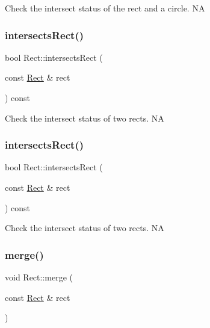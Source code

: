 Check the intersect status of the rect and a circle.  NA \mbox{\label{classRect_a1cda3d61f31818b138c051135c5a3bdd}} 
\subsubsection{\texorpdfstring{intersects\+Rect()}{intersectsRect()}\hspace{0.1cm}{\footnotesize\ttfamily [1/2]}}
{\footnotesize\ttfamily bool Rect\+::intersects\+Rect (\begin{DoxyParamCaption}\item[{const \hyperlink{classRect}{Rect} \&}]{rect }\end{DoxyParamCaption}) const}

Check the intersect status of two rects.  NA \mbox{\label{classRect_a1cda3d61f31818b138c051135c5a3bdd}} 
\subsubsection{\texorpdfstring{intersects\+Rect()}{intersectsRect()}\hspace{0.1cm}{\footnotesize\ttfamily [2/2]}}
{\footnotesize\ttfamily bool Rect\+::intersects\+Rect (\begin{DoxyParamCaption}\item[{const \hyperlink{classRect}{Rect} \&}]{rect }\end{DoxyParamCaption}) const}

Check the intersect status of two rects.  NA \mbox{\label{classRect_aafc3d3683de418f92a7089c7b7a777e0}} 
\subsubsection{\texorpdfstring{merge()}{merge()}\hspace{0.1cm}{\footnotesize\ttfamily [1/2]}}
{\footnotesize\ttfamily void Rect\+::merge (\begin{DoxyParamCaption}\item[{const \hyperlink{classRect}{Rect} \&}]{rect }\end{DoxyParamCaption})}

